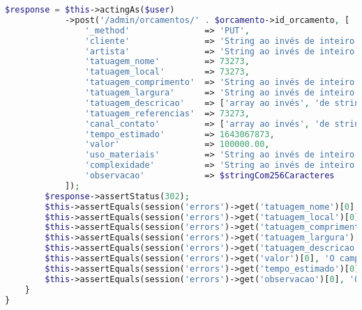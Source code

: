 \begin{lstlisting}[language=PHP, caption= Scripts de teste de Edição de Orçamentos, nolol,
label={code:EdicaoDeOrcamentoTest}]
        $response = $this->actingAs($user)
            ->post('/admin/orcamentos/' . $orcamento->id_orcamento, [
                '_method'               => 'PUT',
                'cliente'               => 'String ao invés de inteiro',
                'artista'               => 'String ao invés de inteiro',
                'tatuagem_nome'         => 73273,
                'tatuagem_local'        => 73273,
                'tatuagem_comprimento'  => 'String ao invés de inteiro',
                'tatuagem_largura'      => 'String ao invés de inteiro',
                'tatuagem_descricao'    => ['array ao invés', 'de string'],
                'tatuagem_referencias'  => 73273,
                'canal_contato'         => ['array ao invés', 'de string'],
                'tempo_estimado'        => 1643067873,
                'valor'                 => 100000.00,
                'uso_materiais'         => 'String ao invés de inteiro',
                'complexidade'          => 'String ao invés de inteiro',
                'observacao'            => $stringCom256Caracteres
            ]);
        $response->assertStatus(302);
        $this->assertEquals(session('errors')->get('tatuagem_nome')[0], 'O campo tatuagem nome deve ser uma string.');
        $this->assertEquals(session('errors')->get('tatuagem_local')[0], 'O campo tatuagem local deve ser uma string.');
        $this->assertEquals(session('errors')->get('tatuagem_comprimento')[0], 'O campo tatuagem comprimento deve ser um número.');
        $this->assertEquals(session('errors')->get('tatuagem_largura')[0], 'O campo tatuagem largura deve ser um número.');
        $this->assertEquals(session('errors')->get('tatuagem_descricao')[0], 'O campo tatuagem descricao deve ser uma string.');
        $this->assertEquals(session('errors')->get('valor')[0], 'O campo valor tem um formato inválido.');
        $this->assertEquals(session('errors')->get('tempo_estimado')[0], 'O campo tempo estimado tem um formato inválido.');
        $this->assertEquals(session('errors')->get('observacao')[0], 'O campo observacao não pode ser superior a 255 caracteres.');
    }
}
\end{lstlisting}

